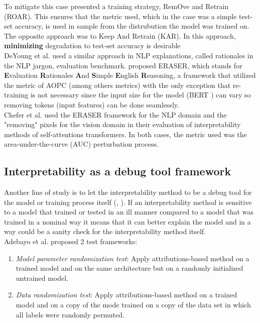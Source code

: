 \documentclass[12pt]{report}
\begin{document}
To mitigate this case \cite{https://doi.org/10.48550/arxiv.1806.10758} presented a training strategy, RemOve and Retrain (ROAR). This ensures that the metric used, which in the case was a simple test-set accuracy, is used in sample from the distrubution the model was trained on. The opposite approach was to Keep And Retrain (KAR). In this approach, \textbf{minimizing} degradation to test-set accuracy is desirable\\

DeYoung et al. \cite{DBLP:journals/corr/abs-1911-03429} used a similar approach in NLP explanations, called rationales in the NLP jargon, evaluation benchmark. \cite{DBLP:journals/corr/abs-1911-03429} proposed ERASER, which stands for \textbf{E}valuation \textbf{R}ationales \textbf{A}nd \textbf{S}imple \textbf{E}nglish \textbf{R}easoning, a framework that utilized the metric of AOPC (among others metrics) with the only exception that re-training is not necessary since the input size for the model (BERT \cite{devlin-etal-2019-bert}) can vary so removing tokens (input features) can be done seamlessly.  \\

Chefer et al. \cite{DBLP:journals/corr/abs-2012-09838} used the ERASER framework for the NLP domain and the "removing" pixels for the vision domain in their evaluation of interpretability methods of self-attentions transformers. In both cases, the metric used was the area-under-the-curve (AUC) perturbation process. 

\newpage
\subsection{Interpretability as a debug tool framework}

Another line of study is to let the interpretability method to be a debug tool for the model or training process itself (\cite{https://doi.org/10.48550/arxiv.1810.03292}, \cite{DBLP:journals/corr/abs-2011-05429}). If an interpretability method is sensitive to a model that trained or tested in an ill manner compared to a model that was trained in a nominal way it means that it can better explain the model and in a way could be a sanity check for the interpretability method itself. \\

Adebayo et al. \cite{https://doi.org/10.48550/arxiv.1810.03292} proposed 2 test frameworks: 
\begin{enumerate}
	\item \textit{Model parameter randomization test}: Apply attributions-based method on a trained model and on the same architecture but on a randomly initialized untrained model.
	\item \textit{Data randomization test}: Apply attributions-based method on a trained model and on a copy of the mode trained on a copy of the data set in which all labels were randomly permuted.
\end{enumerate}
\end{document}
